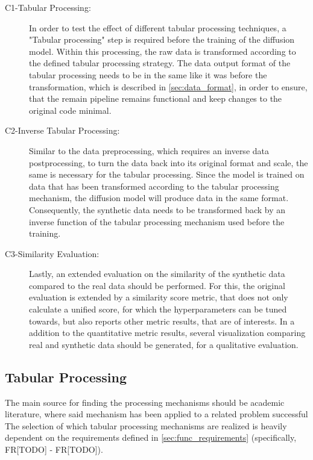 \begin{description}
    \item[C1-Tabular Processing:] In order to test the effect of different tabular processing techniques, a "Tabular processing" step is required before the training of the diffusion model.
    Within this processing, the raw data is transformed according to the defined tabular processing strategy.
    The data output format of the tabular processing needs to be in the same like it was before the transformation, which is described in \autoref{sec:data_format}, in order to ensure, 
    that the remain pipeline remains functional and keep changes to the original code minimal.
    \item[C2-Inverse Tabular Processing:] Similar to the data preprocessing, which requires an inverse data postprocessing, to turn the data back into its original format and scale, the same is necessary for the tabular processing.
    Since the model is trained on data that has been transformed according to the tabular processing mechanism, the diffusion model will produce data in the same format.
    Consequently, the synthetic data needs to be transformed back by an inverse function of the tabular processing mechanism used before the training.
    \item[C3-Similarity Evaluation:] Lastly, an extended evaluation on the similarity of the synthetic data compared to the real data should be performed.
    For this, the original evaluation is extended by a similarity score metric, that does not only calculate a unified score, for which the hyperparameters can be tuned towards,
    but also reports other metric results, that are of interests.
    In a addition to the quantitative metric results, several visualization comparing real and synthetic data should be generated, for a qualitative evaluation.
\end{description}



\subsection{Tabular Processing}
\label{ch:conceptualDesign-codeExtensions-dataPreprocessing}

The main source for finding the processing mechanisms should be academic literature, where said mechanism has been applied to a related problem successful
The selection of which tabular processing mechanisms are realized is heavily dependent on the requirements defined in \autoref{sec:func_requirements} (specifically, FR[TODO] - FR[TODO]).

